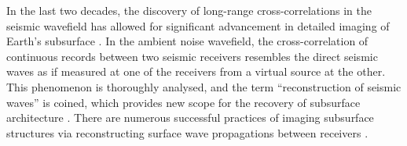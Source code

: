 In the last two decades, the discovery of long-range cross-correlations in the seismic wavefield has allowed for significant advancement in detailed imaging of Earth's subsurface \citep[e.g.,][]{campillo_long-range_2003,shapiro_high-resolution_2005}. In the ambient noise wavefield, the cross-correlation of continuous records between two seismic receivers resembles the direct seismic waves as if measured at one of the receivers from a virtual source at the other. This phenomenon is thoroughly analysed, and the term ``reconstruction of seismic waves'' is coined, which provides new scope for the recovery of subsurface architecture \citep[e.g.,][]{lobkis_emergence_2001,snieder_extracting_2004,wapenaar_tutorial_2010}. There are numerous successful practices of imaging subsurface structures via reconstructing surface wave propagations between receivers \citep[e.g.,][]{yao_surface-wave_2006,lin_ambient_2007,lin_surface_2008,moschetti_surface_2007,bensen_broadband_2008}.





